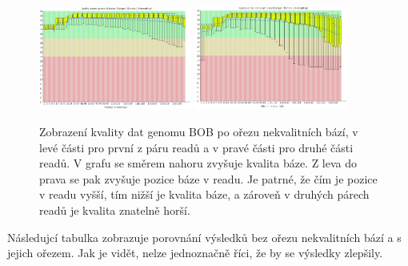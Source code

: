 \documentclass[czech,DP]{thesiskiv}
\numberwithin{equation}{section}
\begin{document}
\begin{figure}[H]		
		\centering
		\includegraphics[width=190px]{./img/quality_graf_bob_trim_r1_8_15.png}
		\includegraphics[width=190px]{./img/quality_graf_bob_trim_r2_8_15.png}
		\caption{Zobrazení kvality dat genomu BOB po ořezu nekvalitních bází, v levé části pro první z páru readů a v pravé části pro druhé části readů. V grafu se směrem nahoru zvyšuje kvalita báze. Z leva do prava se pak zvyšuje pozice báze v readu. Je patrné, že čím je pozice v readu vyšší, tím nižší je kvalita báze, a zároveň v druhých párech readů je kvalita znatelně horší.}
		\label{fig:graf_quality_trim}
\end{figure}


\noindent
Následujcí tabulka zobrazuje porovnání výsledků bez ořezu nekvalitních bází a s jejich ořezem. Jak je vidět, nelze jednoznačně říci, že by se výsledky zlepšily.
\end{document}
